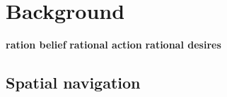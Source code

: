 
\section{Background}






\textbf{ration belief}
\textbf{rational action}
\textbf{rational desires}

\subsection{Spatial navigation}
%
%

